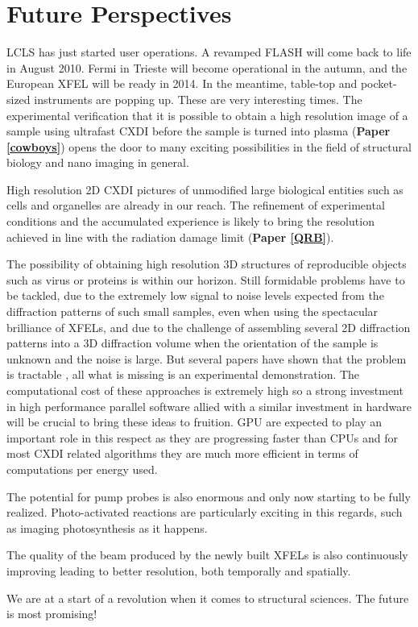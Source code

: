 \chapter{Future Perspectives}\label{Future Perspectives}\noindent

LCLS has just started user operations. A revamped FLASH will come back to life
in August 2010. Fermi in Trieste will become operational in the autumn, and the
European XFEL will be ready in 2014. In the meantime, table-top and pocket-sized
instruments are popping up. These are very interesting times. The experimental
verification that it is possible to obtain a high resolution image of a sample
using ultrafast CXDI before the sample is turned into plasma ({\bf Paper
  \ref{cowboys}}) opens the door to many exciting possibilities in the field of
structural biology and nano imaging in general.

High resolution 2D CXDI pictures of unmodified large biological entities such as cells
and organelles are already in our reach. The refinement of experimental
conditions and the accumulated experience is likely to bring the resolution
achieved in line with the radiation damage limit ({\bf Paper
  \ref{QRB}}).

The possibility of obtaining high resolution 3D structures of reproducible
objects such as virus or proteins is within our horizon. Still formidable
problems have to be tackled, due to the extremely low signal to noise levels
expected from the diffraction patterns of such small samples, even when using
the spectacular brilliance of XFELs, and due to the challenge of assembling
several 2D diffraction patterns into a 3D diffraction volume when the
orientation of the sample is unknown and the noise is large. But several papers
have shown that the problem is tractable
\cite{Elser2009Noise,NeTeDuaneLoh2009Reconstruction,Fung2008Structure}, all 
what is missing is an experimental demonstration. The computational cost of
these approaches is extremely high so a strong investment in high
performance parallel software allied with a similar investment in hardware will
be crucial to bring these ideas to fruition. GPU are expected to play an
important role in this respect as they are progressing faster than CPUs and for
most CXDI related algorithms they are much more efficient in terms of
computations per energy used.

The potential for pump probes is also enormous and only now starting to be
fully realized. Photo-activated reactions are particularly exciting in this
regards, such as imaging photosynthesis as it happens.

The quality of the beam produced by the newly built XFELs is also continuously
improving leading to better resolution, both temporally and spatially.

We are at a start of a revolution when it comes to structural sciences. 
The future is most promising!





